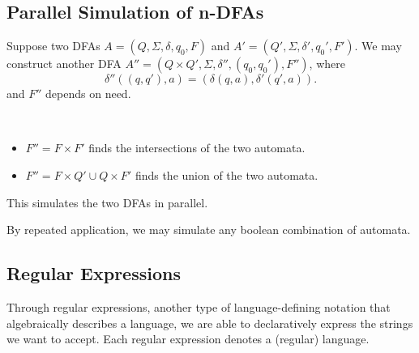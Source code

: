\subsection{Parallel Simulation of n-DFAs}
Suppose two DFAs $A=\left(Q,\Sigma,\delta,q_0,F\right)$ and $A'=\left( Q',\Sigma,
\delta',q_0',F' \right) $.
We may construct another DFA $A''=\left( Q\times
Q',\Sigma,\delta'',\left(q_0,q_0'\right),F'' \right) $, where
\[\delta''\left( \left( q,q' \right) ,a \right) =\left( \delta\left( q,a
\right) ,\delta'\left( q',a \right)  \right).\] 
and $F''$ depends on need.
\begin{example}[Definitions of $F''$]\ 
   \begin{itemize}
    \item $F''=F\times F'$ finds the intersections of the two automata.
    \item $F''=F\times Q'\cup Q\times F'$ finds the union of the two automata.
  \end{itemize}
\end{example}
This simulates the two DFAs in parallel.
\begin{remark}
  By repeated application, we may simulate any boolean combination of
  automata.
\end{remark}


\subsection{Regular Expressions}
Through regular expressions, another type of language-defining notation that
algebraically describes a language, we are able to declaratively express the
strings we want to accept. Each regular expression denotes a (regular) language.
